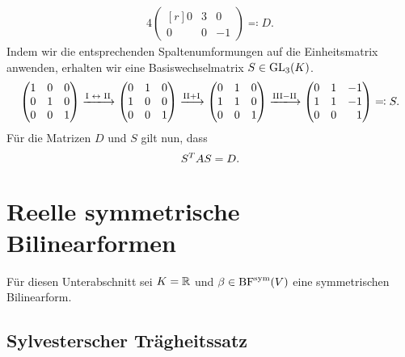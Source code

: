 \begin{example}
\begin{alignat*}{4}
\begin{pmatrix*}[r]
       0 & 3 &  0 \\
       0 & 0 & -1
    \end{pmatrix*}
    \eqqcolon D.
  \end{alignat*}
  Indem wir die entsprechenden Spaltenumformungen auf die Einheitsmatrix anwenden, erhalten wir eine Basiswechselmatrix $S \in \operatorname{GL}_{3}(K)$.
  \[
    \begin{pmatrix*}[r]
      1 & 0 & 0 \\
      0 & 1 & 0 \\
      0 & 0 & 1
    \end{pmatrix*}
    \xlongrightarrow{\text{I $\leftrightarrow$ II}}
    \begin{pmatrix*}[r]
      0 & 1 & 0 \\
      1 & 0 & 0 \\
      0 & 0 & 1
    \end{pmatrix*}
    \xlongrightarrow{\text{II} + \text{I}}
    \begin{pmatrix*}[r]
      0 & 1 & 0 \\
      1 & 1 & 0 \\
      0 & 0 & 1
    \end{pmatrix*}
    \xlongrightarrow{\text{III} - \text{II}}
    \begin{pmatrix*}[r]
      0 & 1 & -1  \\
      1 & 1 & -1  \\
      0 & 0 &  1
    \end{pmatrix*}
    \eqqcolon
    S.
  \]
  Für die Matrizen $D$ und $S$ gilt nun, dass
  \[
      S^T A S
    = D.
  \]

\end{example}





\section{Reelle symmetrische Bilinearformen}

Für diesen Unterabschnitt sei $K = \mathbb{R}$ und $\beta \in \operatorname{BF}^{\operatorname{sym}}(V)$ eine symmetrischen Bilinearform.



\subsection*{Sylvesterscher Trägheitssatz}

